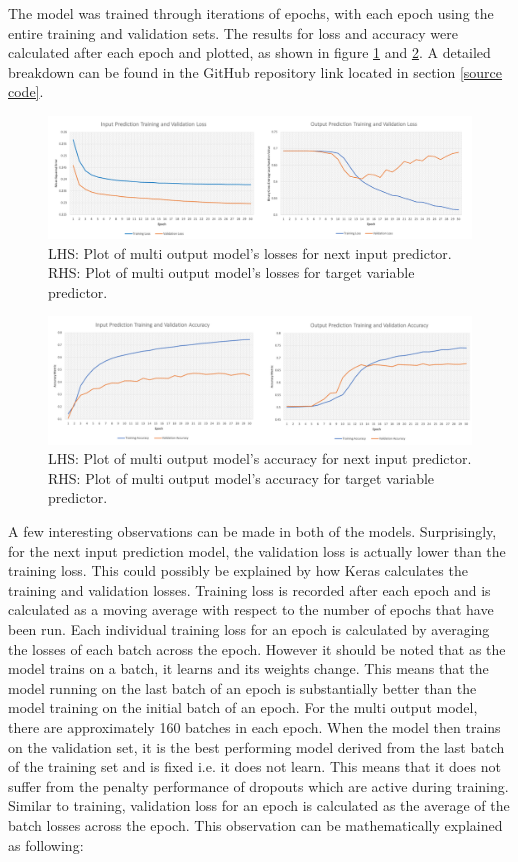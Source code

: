 \documentclass[10pt,onecolumn,letterpaper]{article}
\begin{document}
The model was trained through iterations of epochs, with each epoch using the entire training and validation sets. The results for loss and accuracy were calculated after each epoch and plotted, as shown in figure \ref{loss_plots} and \ref{accuracy_plots}. A detailed breakdown can be found in the GitHub repository link located in section \ref{source code}.

\begin{figure}[!hbt!]
\centering
\includegraphics[width=\columnwidth]{loss_plots.png}
\caption{LHS: Plot of multi output model's losses for next input predictor. RHS: Plot of multi output model's losses for target variable predictor.}
\label{loss_plots}
\end{figure}

\begin{figure}[!hbt!]
\centering
\includegraphics[width=\columnwidth]{accuracy_plots.png}
\caption{LHS: Plot of multi output model's accuracy for next input predictor. RHS: Plot of multi output model's accuracy for target variable predictor.}
\label{accuracy_plots}
\end{figure}

A few interesting observations can be made in both of the models. Surprisingly, for the next input prediction model, the validation loss is actually lower than the training loss. This could possibly be explained by how Keras calculates the training and validation losses. Training loss is recorded after each epoch and is calculated as a moving average with respect to the number of epochs that have been run. Each individual training loss for an epoch is calculated by averaging the losses of each batch across the epoch. However it should be noted that as the model trains on a batch, it learns and its weights change. This means that the model running on the last batch of an epoch is substantially better than the model training on the initial batch of an epoch. For the multi output model, there are approximately 160 batches in each epoch. When the model then trains on the validation set, it is the best performing model derived from the last batch of the training set and is fixed i.e. it does not learn. This means that it does not suffer from the penalty performance of dropouts which are active during training. Similar to training, validation loss for an epoch is calculated as the average of the batch losses across the epoch. This observation can be mathematically explained as following:
\end{document}

